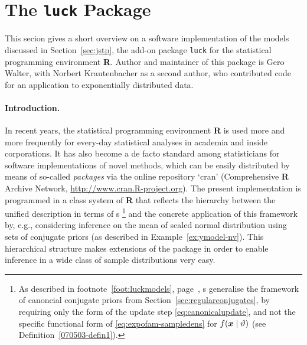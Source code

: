 \section{The \texttt{luck} Package}
\label{sec:luck}



This secion gives a short overview on a software implementation of the models discussed in Section~\ref{sec:jstp},
the add-on package \texttt{luck} \parencite{luck-package} for the statistical programming environment \textbf{R}.
Author and maintainer of this package is Gero Walter,
with Norbert Krautenbacher as a second author, who contributed code for an application
to exponentially distributed data.

\paragraph{Introduction.}
In recent years, the statistical programming environment %
\textbf{R} \parencite{2013:r} is used more and more frequently for every-day statistical analyses
in academia and inside corporations. %
It has also become a de facto standard among
statisticians for software implementations of novel methods,
which can be easily distributed by means of so-called \emph{packages}
via the online repository `cran' (Comprehensive \textbf{R} Archive Network, \url{http://www.cran.R-project.org}).
%
The present implementation is programmed in a class system of \textbf{R}
that reflects %
the hierarchy between the unified description in terms of \model s%
\footnote{As described in footnote~\ref{foot:luckmodels}, page~\pageref{foot:luckmodels},
\model s generalise the framework
of canoncial conjugate priors from Section~\ref{sec:regularconjugates},
by requiring only the form of the update step \eqref{eq:canonicalupdate},
and not the specific functional form of \eqref{eq:expofam-sampledens} for $f({\bm x} \mid \vartheta)$
(see Definition~\ref{070503-defin1}).}
and the concrete application of this framework by, e.g.,
considering inference on the mean of scaled normal distribution using sets of conjugate priors
(as described in Example~\ref{ex:ymodel-nv}).
This hierarchical structure makes extensions of the package in order to
enable inference in a wide class of sample distributions very easy.

